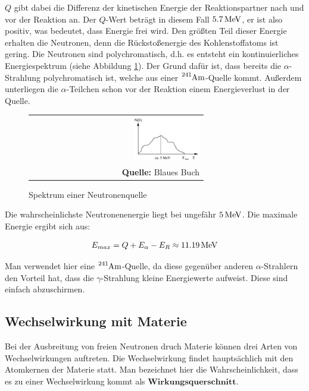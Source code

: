 \documentclass[a4paper,titlepage]{scrartcl}
\numberwithin{equation}{section}
\begin{document}
$Q$ gibt dabei die Differenz der kinetischen Energie der Reaktionspartner nach und vor der Reaktion an. Der $Q$-Wert beträgt in diesem Fall $\unit[5.7]{MeV}$, er ist also positiv, was bedeutet, dass Energie frei wird. Den größten Teil dieser Energie erhalten die Neutronen, denn die Rückstoßenergie des Kohlenstoffatoms ist gering.  Die Neutronen sind polychromatisch, d.h. es entsteht ein kontinuierliches Energiespektrum (siehe Abbildung \ref{fig:spektrum}). Der Grund dafür ist, dass bereits die $\alpha$-Strahlung polychromatisch ist, welche aus einer $\ce{^{241}Am}$-Quelle kommt. Außerdem unterliegen die $\alpha$-Teilchen schon vor der Reaktion einem Energieverlust in der Quelle.\\
\begin{figure}[H]
	\centering
	\begin{tabular}{@{}r@{}}
		\includegraphics[width=0.4\textwidth]{images/spektrum.PNG}\\
		\footnotesize\sffamily\textbf{Quelle:} Blaues Buch \cite{blauesBuch}
	\end{tabular}
	\caption{Spektrum einer Neutronenquelle}
    \label{fig:spektrum}
\end{figure}
Die wahrscheinlichste Neutronenenergie liegt bei ungefähr $\unit[5]{MeV}$. Die maximale Energie ergibt sich aus:

\begin{equation}
E_{max}= Q + E_{\alpha}-E_{R} \approx \unit[11.19]{MeV}
\end{equation}

Man verwendet hier eine $\ce{^{241}Am}$-Quelle, da diese gegenüber anderen $\alpha$-Strahlern den Vorteil hat, dass die $\gamma$-Strahlung kleine Energiewerte aufweist. Diese sind einfach abzuschirmen.

\subsection{Wechselwirkung mit Materie}
Bei der Ausbreitung von freien Neutronen druch Materie können drei Arten von Wechselwirkungen auftreten. Die Wechselwirkung findet hauptsächlich mit den Atomkernen der Materie statt. Man bezeichnet hier die Wahrscheinlichkeit, dass es zu einer Wechselwirkung kommt als $\textbf{Wirkungsquerschnitt}$.
\end{document}
